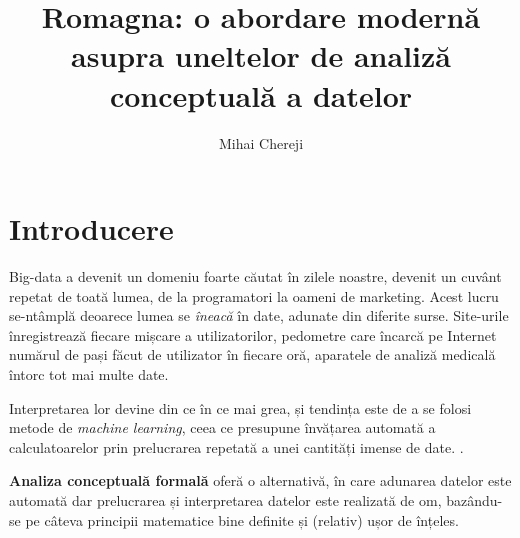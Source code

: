 \documentclass[12pt, a4paper, twoside, romanian]{teza-upb}
\begin{document}
\author{Mihai Chereji}

\title{Romagna: o abordare modernă asupra uneltelor de analiză conceptuală a datelor}




\beforepreface
\listoffigures
\listoftables
{}
\afterpreface 

\chapter*{Introducere}

  Big-data a devenit un domeniu foarte căutat în zilele noastre, devenit un cuvânt repetat de toată lumea, de la programatori la oameni de marketing. 
  Acest lucru se-ntâmplă deoarece lumea se \textit{îneacă} în date, adunate din diferite surse. Site-urile înregistrează fiecare mișcare a utilizatorilor, pedometre care încarcă pe Internet numărul de pași făcut de utilizator în fiecare oră, aparatele de analiză medicală întorc tot mai multe date.

  Interpretarea lor devine din ce în ce mai grea, și tendința este de a se folosi metode de \textit{machine learning}, ceea ce presupune învățarea automată a calculatoarelor prin prelucrarea repetată a unei cantități imense de date. . 
  
  \textbf{Analiza conceptuală formală} oferă o alternativă, în care adunarea datelor este automată dar prelucrarea și interpretarea datelor este realizată de om, bazându-se pe câteva principii matematice bine definite și (relativ) ușor de înțeles. 
\end{document}
